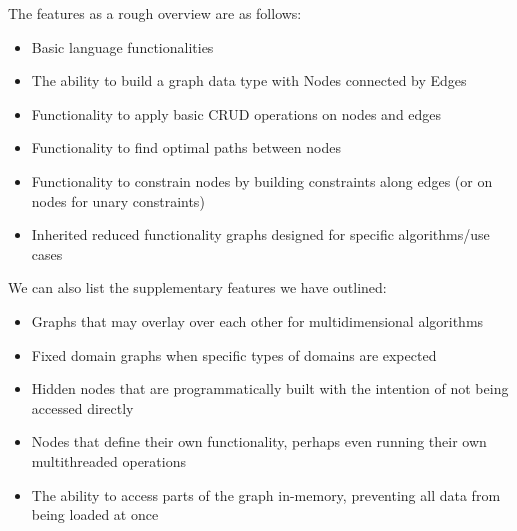 The features as a rough overview are as follows:
\begin{itemize}
    \item Basic language functionalities
    \item The ability to build a graph data type with Nodes connected by Edges
    \item Functionality to apply basic CRUD operations on nodes and edges
    \item Functionality to find optimal paths between nodes
    \item Functionality to constrain nodes by building constraints along edges (or on nodes for unary constraints)
    \item Inherited reduced functionality graphs designed for specific algorithms/use cases
\end{itemize}

We can also list the supplementary features we have outlined:
\begin{itemize}
    \item Graphs that may overlay over each other for multidimensional algorithms
    \item Fixed domain graphs when specific types of domains are expected
    \item Hidden nodes that are programmatically built with the intention of not being accessed directly
    \item Nodes that define their own functionality, perhaps even running their own multithreaded operations
    \item The ability to access parts of the graph in-memory, preventing all data from being loaded at once
\end{itemize}